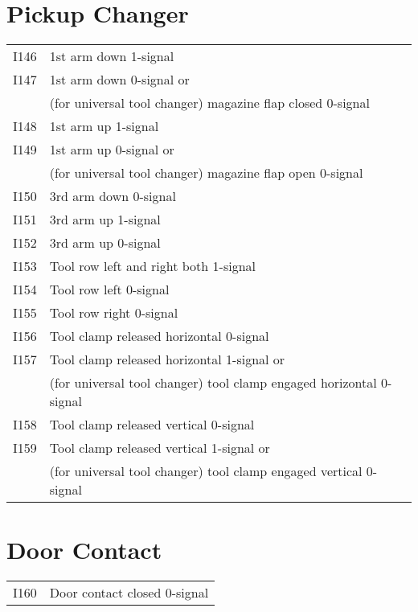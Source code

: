 \documentclass[openany,11pt]{book}
\begin{document}
\section*{Pickup Changer}

\begin{table}[!h]
    \begin{tabular}{ll}
    I146 & 1st arm down 1-signal \\
    I147 & 1st arm down 0-signal or \\
         & (for universal tool changer) magazine flap closed 0-signal \\
    I148 & 1st arm up 1-signal \\
    I149 & 1st arm up 0-signal or \\
         & (for universal tool changer) magazine flap open 0-signal \\
    I150 & 3rd arm down 0-signal \\
    I151 & 3rd arm up 1-signal \\
    I152 & 3rd arm up 0-signal \\
    I153 & Tool row left and right both 1-signal \\
    I154 & Tool row left 0-signal \\
    I155 & Tool row right 0-signal \\
    I156 & Tool clamp released horizontal 0-signal \\
    I157 & Tool clamp released horizontal 1-signal or \\
         & (for universal tool changer) tool clamp engaged horizontal 0-signal \\
    I158 & Tool clamp released vertical 0-signal \\
    I159 & Tool clamp released vertical 1-signal or \\
         & (for universal tool changer) tool clamp engaged vertical 0-signal \\
    \end{tabular}
\end{table}

\section*{Door Contact}

\begin{table}[!h]
    \begin{tabular}{ll}
    I160 & Door contact closed 0-signal \\
    \end{tabular}
\end{table}
\end{document}
